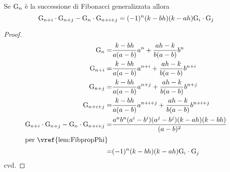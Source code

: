\begin{thm}\label{thm:fibVajdaGen}
	Se $\mathrm{G}_{n}$ è la successione di Fibonacci generalizzata allora 
	\begin{equation}
		\mathrm{G}_{n+i}\cdot\mathrm{G}_{n+j}-\mathrm{G}_{n}\cdot\mathrm{G}_{n+i+j}=(-1)^{n}(k-bh)(k-ah)\mathrm{G}_{i}\cdot\mathrm{G}_{j}
	\end{equation}\label{eqn:fibVajdaGen}
\end{thm}
\begin{proof}
	\begin{align*}
		\Gib{n}=&{}\dfrac{k-bh}{a(a-b)}a^n+\dfrac{ah-k}{b(a-b)}b^n\\
		\Gib{n+i}=&{}\dfrac{k-bh}{a(a-b)}a^{n+i}+\dfrac{ah-k}{b(a-b)}b^{n+i}\\
		\Gib{n+j}=&{}\dfrac{k-bh}{a(a-b)}a^{n+j}+\dfrac{ah-k}{b(a-b)}b^{n+j}\\
		\Gib{n+i+j}=&{}\dfrac{k-bh}{a(a-b)}a^{n+i+j}+\dfrac{ah-k}{b(a-b)}b^{n+i+j}\\
		\Gib{n+i}\cdot\Gib{n+j}-\Gib{n}\cdot\Gib{n+i+j}=&\dfrac{a^nb^n(a^i-b^i)(a^j-b^j)(k-ah)(k-bh)}{(a-b)^2}\\
		\intertext{per~\vref{lem:FibpropPhi}}
		=&(-1)^{n}(k-bh)(k-ah)\Gib{i}\cdot\Gib{j}\\
	\end{align*}
	cvd.
\end{proof}
